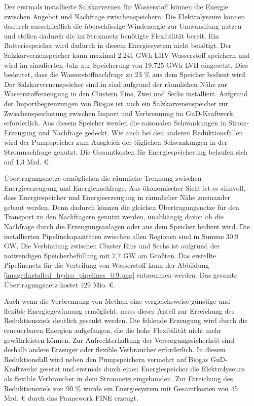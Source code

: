 Der erstmals installierte Salzkarvernen für Wasserstoff können die Energie zwischen Angebot und Nachfrage zwischenspeichern. Die Elektrolyseure können dadurch ausschließlich die überschüssige Windenergie zur Umwandlung nutzen und stellen dadurch die im Stromnetz benötigte Flexibilität bereit. Ein Batteriespeicher wird dadurch in diesem Energiesystem nicht benötigt.
Der Salzkarvernenspeicher kann maximal 2.241 GWh LHV Wasserstoff speichern und wird im simulierten Jahr zur Speicherung von 19.725 GWh LVH eingesetzt. Dies bedeutet, dass die Wasserstoffnachfrage zu 23 \% aus dem Speicher bedient wird. Der Salzkarvernenspeicher sind in sind aufgrund der räumlichen Nähe zur Wasserstofferzeugung in den Clustern Eins, Zwei und Sechs installiert.
Aufgrund der Importbegrenzungen von Biogas ist auch ein Salzkarvenenspeicher zur Zwischenspeicherung zwischen Import und Verbrennung im GuD-Kraftwerk erforderlich. Aus diesem Speicher werden die saisonalen Schwankungen in Strom-Erzeugung und Nachfrage gedeckt.
Wie auch bei den anderen Reduktionsfällen wird der Pumpspeicher zum Ausgleich der täglichen Schwankungen in der Stromnachfrage genutzt. 
Die Gesamtkosten für Energiespeicherung belaufen sich auf 1,3 Mrd. €.


Übertragungsnetze ermöglichen die räumliche Trennung zwischen Energieerzeugung und Energienachfrage. 
Aus ökonomischer Sicht ist es sinnvoll, dass Energiespeicher und Energieerzeugung in räumlicher Nähe zueinander gebaut werden. Denn dadurch können die gleichen Übertragungsnetze für den Transport zu den Nachfragern genutzt werden, unabhängig davon ob die Nachfrage durch die Erzeugungsanlagen oder aus dem Speicher bedient wird. 
Die installierten Pipelinekapazitäten zwischen allen Regionen sind in Summe 30,9 GW. Die Verbindung zwischen Cluster Eins und Sechs ist aufgrund der notwendigen Speicherbefüllung mit 7,7 GW am Größten.
Das erstellte Pipelinenetz für die Verteilung von Wasserstoff kann der Abbildung \ref{image:Installed_hydro_pipelines_0.9.png} entnommen werden. Das gesamte Übertragungsnetz kostet 129 Mio. €.

Auch wenn die Verbrennung von Methan eine vergleichsweise günstige und flexible Energiegewinnung ermöglicht, muss dieser Anteil zur Erreichung des Reduktionsziels deutlich gesenkt werden. Die fehlende Erzeugung wird durch die erneuerbaren Energien aufgefangen, die die hohe Flexibilität nicht mehr gewährleisten können. Zur Aufrechterhaltung der Versorgungssicherheit sind deshalb andere Erzeuger oder flexible Verbraucher erforderlich. In diesem Reduktionsfall wird neben den Pumpspeichern vermehrt auf Biogas GuD-Kraftwerke gesetzt und erstmals durch einen Energiespeicher die Elektrolyseure als flexible Verbraucher in dem Stromnetz eingebunden.
Zur Erreichung des Reduktionsziels von 90 \% wurde ein Energiesystem mit Gesamtkosten von 45 Mrd. € durch das Framework FINE erzeugt.

